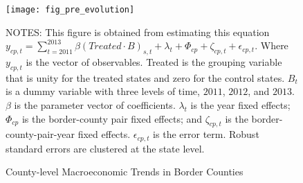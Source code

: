 \begin{figure}[H]
    \centering
    \texttt{[image: fig\_pre\_evolution]}
    \caption{County-level Macroeconomic Trends in Border Counties}
    \label{fig:county-level-macroeconomic-trends-in-border-counties}
    \begin{minipage}{18cm}
        \vspace{0.05in}
        {NOTES: This figure is obtained from estimating this equation $y_{cp,t} = \sum_{t = 2011}^{2013} \beta (Treated \cdot B)_{s,t} + \lambda_{t} + \Phi_{cp} + \zeta_{cp,t} + \epsilon_{cp,t}$. Where $y_{cp,t}$ is the vector of observables. Treated is the grouping variable that is unity for the treated states and zero for the control states. $B_{t}$ is a dummy variable with three levels of time, $2011$, $2012$, and $2013$. $\beta$ is the parameter vector of coefficients. $\lambda_{t}$ is the year fixed effects; $\Phi_{cp}$ is the border-county pair fixed effects; and $\zeta_{cp,t}$ is the border-county-pair-year fixed effects. $\epsilon_{cp,t}$ is the error term. Robust standard errors are clustered at the state level. \par}
    \end{minipage}
\end{figure}